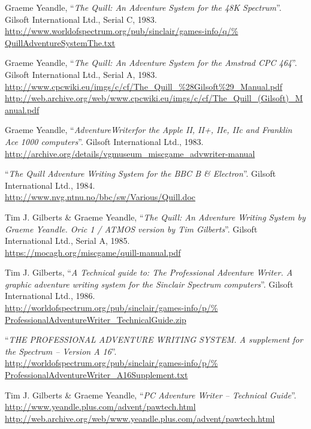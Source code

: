 \documentclass[11pt, a5paper]{article}
\begin{document}
\begin{thebibliography}{99}

  Graeme Yeandle,
  ``\emph{The Quill: An Adventure System for the 48K Spectrum}''.
  Gilsoft International Ltd.,
  Serial C,
  1983.\\
  \url{http://www.worldofspectrum.org/pub/sinclair/games-info/q/%
       QuillAdventureSystemThe.txt}

  Graeme Yeandle,
  ``\emph{The Quill: An Adventure System for the Amstrad CPC 464}''.
  Gilsoft International Ltd.,
  Serial A,
  1983.\\
  \url{http://www.cpcwiki.eu/imgs/c/cf/The_Quill_%28Gilsoft%29_Manual.pdf}\\
  \url{http://web.archive.org/web/www.cpcwiki.eu/imgs/c/cf/The_Quill_(Gilsoft)_Manual.pdf}

  Graeme Yeandle,
  ``\emph{AdventureWriter\texttrademark for the Apple II, II+, IIe, IIc and Franklin Ace 1000 computers}''.
  Gilsoft International Ltd.,
  1983.\\
  \url{http://archive.org/details/vgmuseum_miscgame_advwriter-manual}

  ``\emph{The Quill Adventure Writing System for the BBC B \& Electron}''.
  Gilsoft International Ltd.,
  1984.\\
  \url{http://www.nvg.ntnu.no/bbc/sw/Various/Quill.doc}

  Tim J. Gilberts \& Graeme Yeandle,
  ``\emph{The Quill: An Adventure Writing System by Graeme Yeandle. Oric 1 /
  ATMOS version by Tim Gilberts}''.
  Gilsoft International Ltd.,
  Serial A,
  1985.\\
  \url{https://mocagh.org/miscgame/quill-manual.pdf}

  Tim J. Gilberts,
  ``\emph{A Technical guide to: The Professional Adventure Writer. A graphic
  adventure writing system for the Sinclair Spectrum computers}''.
  Gilsoft International Ltd.,
  1986.\\
  \url{http://worldofspectrum.org/pub/sinclair/games-info/p/%
       ProfessionalAdventureWriter_TechnicalGuide.zip}

  ``\emph{THE PROFESSIONAL ADVENTURE WRITING SYSTEM. A supplement for the
  Spectrum -- Version A 16}''.\\
  \url{http://worldofspectrum.org/pub/sinclair/games-info/p/%
       ProfessionalAdventureWriter_A16Supplement.txt}

  Tim J. Gilberts \& Graeme Yeandle,
  ``\emph{PC Adventure Writer -- Technical Guide}''.\\
  \url{http://www.yeandle.plus.com/advent/pawtech.html}\\
  \url{http://web.archive.org/web/www.yeandle.plus.com/advent/pawtech.html}


\end{thebibliography}
\end{document}
